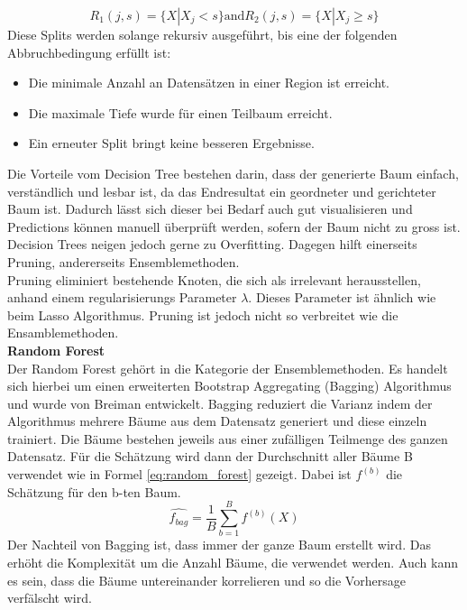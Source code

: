 %
\begin{equation}
\label{eq:splitting}
R_1(j,s) = \{X|X_j < s\} \text{and} R_2(j,s) = \{X|X_j \geq s\}
\end{equation}
%
\newline
Diese Splits werden solange rekursiv ausgeführt, bis eine der folgenden Abbruchbedingung erfüllt ist:
\begin{itemize}
\item Die minimale Anzahl an Datensätzen in einer Region ist erreicht.
\item Die maximale Tiefe wurde für einen Teilbaum erreicht.
\item Ein erneuter Split bringt keine besseren Ergebnisse.
\end{itemize}
Die Vorteile vom Decision Tree bestehen darin, dass der generierte Baum einfach, verständlich und lesbar ist, da das Endresultat ein geordneter und gerichteter Baum ist. Dadurch lässt sich dieser bei Bedarf auch gut visualisieren und Predictions können manuell überprüft werden, sofern der Baum nicht zu gross ist.\\
Decision Trees neigen jedoch gerne zu Overfitting. Dagegen hilft einerseits Pruning, andererseits Ensemblemethoden.\\
Pruning eliminiert bestehende Knoten, die sich als irrelevant herausstellen, anhand einem regularisierungs Parameter $\lambda$. Dieses Parameter ist ähnlich wie beim Lasso Algorithmus. Pruning ist jedoch nicht so verbreitet wie die Ensamblemethoden.\\[2ex]
%
\textbf{Random Forest}\\
Der Random Forest gehört in die Kategorie der Ensemblemethoden. Es handelt sich hierbei um einen erweiterten Bootstrap Aggregating (Bagging) Algorithmus und wurde von Breiman entwickelt. Bagging reduziert die Varianz indem der Algorithmus mehrere Bäume aus dem Datensatz generiert und diese einzeln trainiert.  Die Bäume bestehen jeweils aus einer zufälligen Teilmenge des ganzen Datensatz. Für die Schätzung wird dann der Durchschnitt aller Bäume B verwendet wie in Formel \eqref{eq:random_forest} gezeigt. Dabei ist $f^{(b)}$ die Schätzung für den b-ten Baum.
%
\begin{equation}
\label{eq:random_forest}
\hat{f_{bag}} = \frac{1}{B} \sum_{b=1}^{B} f^{(b)} (X)
\end{equation}
%
\newline
Der Nachteil von Bagging ist, dass immer der ganze Baum erstellt wird. Das erhöht die Komplexität um die Anzahl Bäume, die verwendet werden. Auch kann es sein, dass die Bäume untereinander korrelieren und so die Vorhersage verfälscht wird.\\
